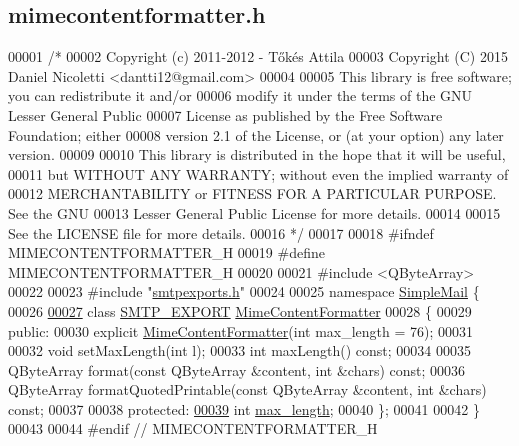 \hypertarget{mimecontentformatter_8h_source}{}\subsection{mimecontentformatter.\+h}
\label{mimecontentformatter_8h_source}

\begin{DoxyCode}
00001 \textcolor{comment}{/*}
00002 \textcolor{comment}{  Copyright (c) 2011-2012 - Tőkés Attila}
00003 \textcolor{comment}{  Copyright (C) 2015 Daniel Nicoletti <dantti12@gmail.com>}
00004 \textcolor{comment}{}
00005 \textcolor{comment}{  This library is free software; you can redistribute it and/or}
00006 \textcolor{comment}{  modify it under the terms of the GNU Lesser General Public}
00007 \textcolor{comment}{  License as published by the Free Software Foundation; either}
00008 \textcolor{comment}{  version 2.1 of the License, or (at your option) any later version.}
00009 \textcolor{comment}{}
00010 \textcolor{comment}{  This library is distributed in the hope that it will be useful,}
00011 \textcolor{comment}{  but WITHOUT ANY WARRANTY; without even the implied warranty of}
00012 \textcolor{comment}{  MERCHANTABILITY or FITNESS FOR A PARTICULAR PURPOSE.  See the GNU}
00013 \textcolor{comment}{  Lesser General Public License for more details.}
00014 \textcolor{comment}{}
00015 \textcolor{comment}{  See the LICENSE file for more details.}
00016 \textcolor{comment}{*/}
00017 
00018 \textcolor{preprocessor}{#ifndef MIMECONTENTFORMATTER\_H}
00019 \textcolor{preprocessor}{#define MIMECONTENTFORMATTER\_H}
00020 
00021 \textcolor{preprocessor}{#include <QByteArray>}
00022 
00023 \textcolor{preprocessor}{#include "\hyperlink{smtpexports_8h}{smtpexports.h}"}
00024 
00025 \textcolor{keyword}{namespace }\hyperlink{namespace_simple_mail}{SimpleMail} \{
00026 
\hyperlink{class_simple_mail_1_1_mime_content_formatter}{00027} \textcolor{keyword}{class }\hyperlink{smtpexports_8h_ac580c9660cb24a34b13807f4eb0e1bd0}{SMTP\_EXPORT} \hyperlink{class_simple_mail_1_1_mime_content_formatter}{MimeContentFormatter}
00028 \{
00029 \textcolor{keyword}{public}:
00030     \textcolor{keyword}{explicit} \hyperlink{class_simple_mail_1_1_mime_content_formatter}{MimeContentFormatter}(\textcolor{keywordtype}{int} max\_length = 76);
00031 
00032     \textcolor{keywordtype}{void} setMaxLength(\textcolor{keywordtype}{int} l);
00033     \textcolor{keywordtype}{int} maxLength() \textcolor{keyword}{const};
00034 
00035     QByteArray format(\textcolor{keyword}{const} QByteArray &content, \textcolor{keywordtype}{int} &chars) \textcolor{keyword}{const};
00036     QByteArray formatQuotedPrintable(\textcolor{keyword}{const} QByteArray &content, \textcolor{keywordtype}{int} &chars) \textcolor{keyword}{const};
00037 
00038 \textcolor{keyword}{protected}:
\hyperlink{class_simple_mail_1_1_mime_content_formatter_a5c7278fb3bd794bc4ff408169cfef6fd}{00039}     \textcolor{keywordtype}{int} \hyperlink{class_simple_mail_1_1_mime_content_formatter_a5c7278fb3bd794bc4ff408169cfef6fd}{max\_length};
00040 \};
00041 
00042 \}
00043 
00044 \textcolor{preprocessor}{#endif // MIMECONTENTFORMATTER\_H}
\end{DoxyCode}
